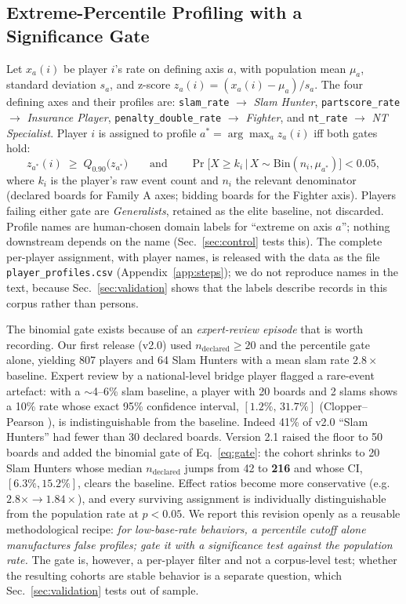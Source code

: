 \documentclass[runningheads]{llncs}
\begin{document}
\subsection{Extreme-Percentile Profiling with a Significance Gate}\label{sec:profiles}

Let $x_{a}(i)$ be player $i$'s rate on defining axis $a$, with
population mean $\mu_a$, standard deviation $s_a$, and z-score
$z_a(i) = (x_a(i)-\mu_a)/s_a$. The four defining axes and their
profiles are: \texttt{slam\_rate} $\to$ \emph{Slam Hunter},
\texttt{partscore\_rate} $\to$ \emph{Insurance Player},
\texttt{penalty\_double\_rate} $\to$ \emph{Fighter}, and
\texttt{nt\_rate} $\to$ \emph{NT Specialist}. Player $i$ is assigned to
profile $a^{*} = \arg\max_a z_a(i)$ iff both gates hold:
\begin{equation}
z_{a^{*}}(i) \;\ge\; Q_{0.90}\bigl(z_{a^{*}}\bigr)
\qquad\text{and}\qquad
\Pr\bigl[X \ge k_i \,\big|\, X\sim\mathrm{Bin}(n_i, \mu_{a^{*}})\bigr] < 0.05,
\label{eq:gate}
\end{equation}
where $k_i$ is the player's raw event count and $n_i$ the relevant
denominator (declared boards for Family A axes; bidding boards for the
Fighter axis). Players failing either gate are \emph{Generalists}, retained as the elite baseline, not discarded. Profile names are
human-chosen domain labels for ``extreme on axis $a$''; nothing
downstream depends on the name (Sec.~\ref{sec:control} tests this).
The complete per-player assignment, with player names, is released
with the data as the file \texttt{player\_profiles.csv}
(Appendix~\ref{app:steps}); we do not reproduce names in the text,
because Sec.~\ref{sec:validation} shows that the labels describe
records in this corpus rather than persons.

The binomial gate exists because of an \emph{expert-review episode}
that is worth recording.
Our first release (v2.0) used $n_{\mathrm{declared}}\ge20$ and the
percentile gate alone, yielding 807 players and 64 Slam Hunters with a
mean slam rate $2.8\times$ baseline. Expert review by a national-level
bridge player flagged a rare-event artefact: with a
$\sim$4--6\% slam baseline, a player with 20 boards and 2 slams shows a
10\% rate whose exact 95\% confidence interval, $[1.2\%,\,31.7\%]$
(Clopper--Pearson \cite{clopper1934use}), is indistinguishable from
the baseline. Indeed 41\% of v2.0 ``Slam Hunters'' had fewer than 30
declared boards. Version 2.1 raised the floor to 50 boards and added the
binomial gate of Eq.~\eqref{eq:gate}: the cohort shrinks to 20 Slam
Hunters whose median $n_{\mathrm{declared}}$ jumps from 42 to
\textbf{216} and whose CI, $[6.3\%, 15.2\%]$, clears the baseline.
Effect ratios become more conservative (e.g.\ $2.8\times\to1.84\times$),
and every surviving assignment is individually distinguishable from the
population rate at $p<0.05$. We report this revision openly as a
reusable methodological recipe: \emph{for low-base-rate behaviors, a
percentile cutoff alone manufactures false profiles; gate it with a
significance test against the population rate.} The gate is, however,
a per-player filter and not a corpus-level test; whether the resulting
cohorts are stable behavior is a separate question, which
Sec.~\ref{sec:validation} tests out of sample.
\end{document}

